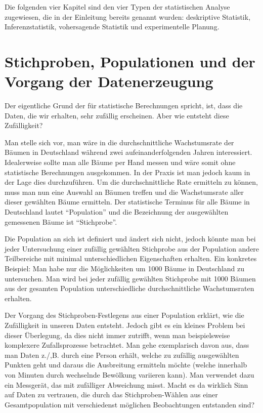 \documentclass[a4paper,twoside]{tufte-book}\usepackage[]{graphicx}\usepackage[]{color}
\begin{document}
	Die folgenden vier Kapitel sind den vier Typen der statistischen Analyse zugewiesen, die in der Einleitung bereits genannt wurden: deskriptive Statistik, Inferenzstatistik, vohersagende Statistik und experimentelle Planung. 
	
	\section{Stichproben, Populationen und der Vorgang der Datenerzeugung}
	
	Der eigentliche Grund der für statistische Berechnungen spricht, ist, dass die Daten, die wir erhalten, sehr zufällig erscheinen. Aber wie entsteht diese Zufälligkeit?
	
	Man stelle sich vor,  man wäre in die durchschnittliche Wachstumsrate der Bäumen in Deutschland während zwei aufeinanderfolgenden Jahren interessiert. Idealerweise sollte man alle Bäume per Hand messen und wäre somit ohne statistische Berechnungen ausgekommen. In der Praxis ist man jedoch kaum in der Lage dies durchzuführen. Um die durchschnittliche Rate ermitteln zu können, muss man nun eine Auswahl an Bäumen treffen und die Wachstumsrate aller dieser gewählten Bäume ermitteln. Der statistische Terminus für alle Bäume in Deutschland lautet "`Population"' und die Bezeichnung der ausgewählten gemessenen Bäume ist "`Stichprobe"'.
	
	Die  Population an sich ist definiert und ändert sich nicht, jedoch könnte man bei jeder Untersuchung einer zufällig gewählten Stichprobe aus der Population andere Teilbereiche mit minimal unterschiedlichen Eigenschaften erhalten. Ein konkretes Beispiel: Man habe nur die Möglichkeiten um 1000 Bäume in Deutschland zu untersuchen. Man wird bei jeder zufällig gewählten Stichprobe mit 1000 Bäumen aus der gesamten Population unterschiedliche durchschnittliche Wachstumsraten erhalten.
	
	Der Vorgang des Stichproben-Festlegens aus einer Population erklärt, wie die Zufälligkeit in unseren Daten entsteht. Jedoch gibt es ein kleines Problem bei dieser Überlegung, da dies nicht immer zutrifft, wenn man beispielsweise komplexere Zufallsprozesse betrachtet. Man gehe exemplarisch davon aus, dass man Daten z./,B. durch eine Person erhält, welche zu zufällig ausgewählten Punkten geht und daraus die Ausbreitung ermitteln möchte (welche innerhalb von Minuten durch wechselnde Bewölkung variieren kann). Man verwendet dazu ein Messgerät, das mit zufälliger Abweichung misst. Macht es da wirklich Sinn auf Daten zu vertrauen, die durch das Stichproben-Wählen aus einer Gesamtpopulation mit verschiedenst möglichen Beobachtungen entstanden sind?
	
\end{document}
